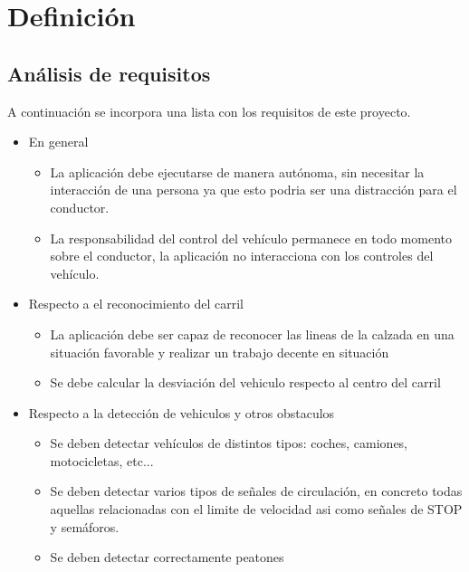 \section{Definición}
\subsection{Análisis de requisitos}

A continuación se incorpora una lista con los requisitos de este proyecto.

\begin{itemize}
    \item En general
    \begin{itemize}
        \item La aplicación debe ejecutarse de manera autónoma, sin necesitar la interacción de una persona ya que esto podria ser una distracción para el conductor.
        \item La responsabilidad del control del vehículo permanece en todo momento sobre el conductor, la aplicación no interacciona con los controles del vehículo.
    \end{itemize}

    \item Respecto a el reconocimiento del carril
    \begin{itemize}
        \item La aplicación debe ser capaz de reconocer las lineas de la calzada en una situación favorable y realizar un trabajo decente en situación
        \item Se debe calcular la desviación del vehiculo respecto al centro del carril
    \end{itemize}

    \item Respecto a la detección de vehiculos y otros obstaculos
    \begin{itemize}
        \item Se deben detectar vehículos de distintos tipos: coches, camiones, motocicletas, etc...
        \item Se deben detectar varios tipos de señales de circulación, en concreto todas aquellas relacionadas con el limite de velocidad asi como señales de STOP y semáforos.
        \item Se deben detectar correctamente peatones
    \end{itemize}


\end{itemize}
